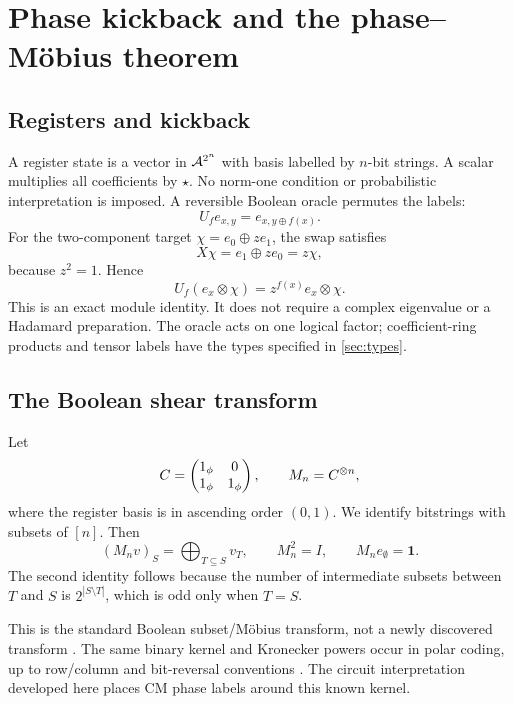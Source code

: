 \section{Phase kickback and the phase--M\"obius theorem}\label{sec:mobius}
\subsection{Registers and kickback}
A register state is a vector in $\mathcal A^{2^n}$ with basis labelled by $n$-bit strings. A scalar multiplies all coefficients by $\star$. No norm-one condition or probabilistic interpretation is imposed. A reversible Boolean oracle permutes the labels:
\begin{equation}
 U_f e_{x,y}=e_{x,y\oplus f(x)}.
\end{equation}
For the two-component target $\chi=e_0\oplus z e_1$, the swap satisfies
\begin{equation}
 X\chi=e_1\oplus z e_0=z\chi,
\end{equation}
because $z^2=1$. Hence
\begin{equation}\label{eq:kickback}
 U_f(e_x\otimes\chi)=z^{f(x)}e_x\otimes\chi.
\end{equation}
This is an exact module identity. It does not require a complex eigenvalue or a Hadamard preparation. The oracle acts on one logical factor; coefficient-ring products and tensor labels have the types specified in \cref{sec:types}.

\subsection{The Boolean shear transform}
Let
\begin{equation}\label{eq:mobiusmatrix}
 C=\begin{pmatrix}1_{\phi}&0\\1_{\phi}&1_{\phi}\end{pmatrix},
 \qquad M_n=C^{\otimes n},
\end{equation}
where the register basis is in ascending order $(0,1)$. We identify bitstrings with subsets of $[n]$. Then
\begin{equation}\label{eq:subset}
 (M_n v)_S=\bigoplus_{T\subseteq S}v_T,
 \qquad M_n^2=I,\qquad M_ne_\emptyset=\mathbf1.
\end{equation}
The second identity follows because the number of intermediate subsets between $T$ and $S$ is $2^{|S\setminus T|}$, which is odd only when $T=S$.

This is the standard Boolean subset/M\"obius transform, not a newly discovered transform \cite{barbier}. The same binary kernel and Kronecker powers occur in polar coding, up to row/column and bit-reversal conventions \cite{arikan}. The circuit interpretation developed here places CM phase labels around this known kernel.

